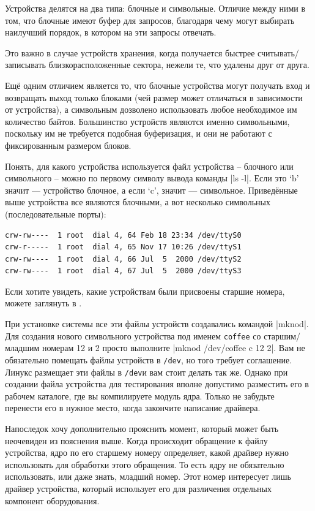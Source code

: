 \documentclass[10pt, oneside]{book}
\begin{document}
Устройства делятся на два типа: блочные и символьные. Отличие между ними в том, что блочные имеют буфер для запросов, благодаря чему могут выбирать наилучший порядок, в котором на эти запросы отвечать.

Это важно в случае устройств хранения, когда получается быстрее считывать/записывать близкорасположенные сектора, нежели те, что удалены друг от друга.

Ещё одним отличием является то, что блочные устройства могут получать вход и возвращать выход только блоками (чей размер может отличаться в зависимости от
устройства), а символьным дозволено использовать любое необходимое им количество байтов. Большинство устройств являются именно символьными, поскольку им не требуется подобная буферизация, и они не работают с фиксированным размером блоков.

Понять, для какого устройства используется файл устройства – блочного или символьного – можно по первому символу вывода команды \sh|ls -l|.
Если это `b' значит — устройство блочное, а если `c', значит — символьное. Приведённые выше устройства все являются блочными, а вот несколько символьных (последовательные порты):

\begin{verbatim}
crw-rw----  1 root  dial 4, 64 Feb 18 23:34 /dev/ttyS0
crw-r-----  1 root  dial 4, 65 Nov 17 10:26 /dev/ttyS1
crw-rw----  1 root  dial 4, 66 Jul  5  2000 /dev/ttyS2
crw-rw----  1 root  dial 4, 67 Jul  5  2000 /dev/ttyS3
\end{verbatim}

Если хотите увидеть, какие устройствам были присвоены старшие номера, можете заглянуть в .

При установке системы все эти файлы устройств создавались командой \sh|mknod|.
Для создания нового символьного устройства под именем \verb|coffee| со старшим/младшим номерам 12 и 2 просто выполните \sh|mknod /dev/coffee c 12 2|.
Вам не обязательно помещать файлы устройств в \verb|/dev|, но того требует соглашение.
Линукс размещает эти файлы в \verb|/dev|и вам стоит делать так же. Однако при создании файла устройства для тестирования вполне допустимо разместить его в рабочем каталоге, где вы компилируете модуль ядра. Только не забудьте перенести его в нужное место, когда закончите написание драйвера.

Напоследок хочу дополнительно прояснить момент, который может быть неочевиден из пояснения выше. Когда происходит обращение к файлу устройства, ядро по его старшему номеру определяет, какой драйвер нужно использовать для обработки этого обращения. То есть ядру не обязательно использовать, или даже знать, младший номер. Этот номер интересует лишь драйвер устройства, который использует его для различения отдельных компонент оборудования.
\end{document}
